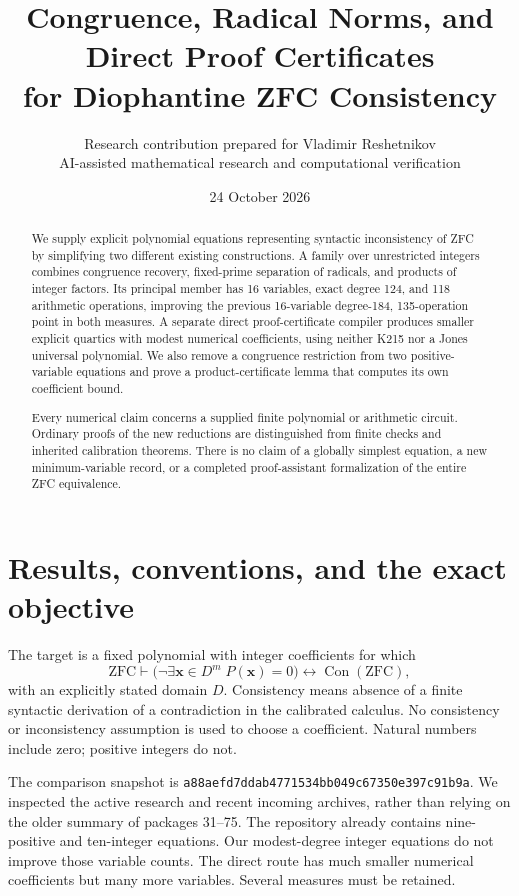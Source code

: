 \documentclass[11pt]{article}
\title{Congruence, Radical Norms, and Direct Proof Certificates\\for Diophantine ZFC Consistency}
\author{Research contribution prepared for Vladimir Reshetnikov\\\small AI-assisted mathematical research and computational verification}
\date{24 October 2026}
\theoremstyle{remark}\newtheorem{remark}[theorem]{Remark}
\newcommand{\Con}{\operatorname{Con}}\newcommand{\Pair}{\operatorname{Pair}}
\newcommand{\repo}{\nolinkurl{a88aefd7ddab4771534bb049c67350e397c91b9a}}
\begin{document}
\maketitle
\begin{abstract}
We supply explicit polynomial equations representing syntactic inconsistency
of ZFC by simplifying two different existing constructions. A family over
unrestricted integers combines congruence recovery, fixed-prime separation
of radicals, and products of integer factors. Its principal member has
16 variables, exact degree 124, and 118 arithmetic operations, improving
the previous 16-variable degree-184, 135-operation point in both measures.
A separate direct proof-certificate compiler produces smaller explicit
quartics with modest numerical coefficients, using neither K215 nor a
Jones universal polynomial. We also remove a congruence restriction from
two positive-variable equations and prove a product-certificate lemma
that computes its own coefficient bound.

Every numerical claim concerns a supplied finite polynomial or arithmetic
circuit. Ordinary proofs of the new reductions are distinguished from
finite checks and inherited calibration theorems. There is no claim of a
globally simplest equation, a new minimum-variable record, or a completed
proof-assistant formalization of the entire ZFC equivalence.
\end{abstract}
\tableofcontents\newpage

\section{Results, conventions, and the exact objective}
The target is a fixed polynomial with integer coefficients for which
\[
 \mathrm{ZFC}\vdash
 \bigl(\neg\exists\boldsymbol{x}\in D^m\;P(\boldsymbol{x})=0\bigr)
 \longleftrightarrow\Con(\mathrm{ZFC}),
\]
with an explicitly stated domain $D$. Consistency means absence of a
finite syntactic derivation of a contradiction in the calibrated calculus.
No consistency or inconsistency assumption is used to choose a coefficient.
Natural numbers include zero; positive integers do not.

The comparison snapshot is \repo. We inspected the active research and
recent incoming archives, rather than relying on the older summary of
packages 31--75. The repository already contains nine-positive and
ten-integer equations. Our modest-degree integer equations do not improve
those variable counts. The direct route has much smaller numerical
coefficients but many more variables. Several measures must be retained.

\end{document}
